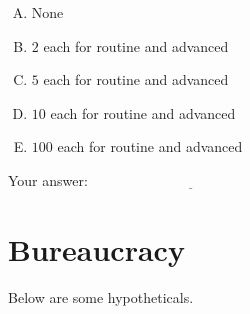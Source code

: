 \documentclass[10pt]{amsart}
\begin{document}
\begin{enumerate}
  \begin{enumerate}[(A)]
  \item None
  \item $2$ each for routine and advanced
  \item $5$ each for routine and advanced
  \item $10$ each for routine and advanced
  \item $100$ each for routine and advanced
  \end{enumerate}

  \vspace{0.1in}
  Your answer: $\underline{\qquad\qquad\qquad\qquad\qquad\qquad\qquad}$
  \vspace{0.1in}
\end{enumerate}

\section{Bureaucracy}

Below are some hypotheticals.
\end{document}
